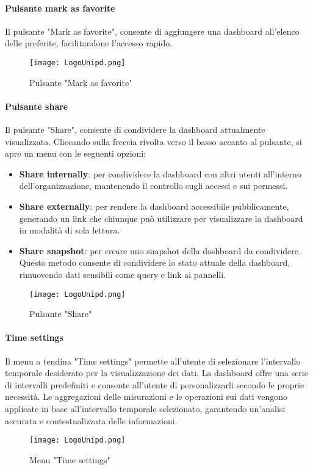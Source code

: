 \documentclass[10pt]{article}
\begin{document}
\begin{justify}
    \paragraph{Pulsante mark as favorite}
    Il pulsante "Mark as favorite", consente di aggiungere una dashboard all'elenco delle preferite, facilitandone l'accesso rapido.
    \begin{figure}[H]
    \centering
    \texttt{[image: LogoUnipd.png]}
    \caption{Pulsante "Mark as favorite"}
    \end{figure}

    \paragraph{Pulsante share}
    Il pulsante "Share", consente di condividere la dashboard attualmente visualizzata. Cliccando sulla freccia rivolta verso il basso accanto al pulsante, si apre un menu con le seguenti opzioni:
    \begin{itemize}
        \item \textbf{Share internally}: per condividere la dashboard con altri utenti all'interno dell'organizzazione, mantenendo il controllo sugli accessi e sui permessi.
        \item \textbf{Share externally}: per rendere la dashboard accessibile pubblicamente, generando un link che chiunque può utilizzare per visualizzare la dashboard in modalità di sola lettura.
        \item \textbf{Share snapshot}: per creare uno snapshot della dashboard da condividere. Questo metodo consente di condividere lo stato attuale della dashboard, rimuovendo dati sensibili come query e link ai pannelli.
    \end{itemize}
    \begin{figure}[H]
    \centering
    \texttt{[image: LogoUnipd.png]}
    \caption{Pulsante "Share"}
    \end{figure}

    \paragraph{Time settings}
    Il menu a tendina "Time settings" permette all'utente di selezionare l'intervallo temporale desiderato per la visualizzazione dei dati. La dashboard offre una serie di intervalli predefiniti e consente all'utente di personalizzarli secondo le proprie necessità. Le aggregazioni delle misurazioni e le operazioni sui dati vengono applicate in base all'intervallo temporale selezionato, garantendo un'analisi accurata e contestualizzata delle informazioni.
    \begin{figure}[H]
    \centering
    \texttt{[image: LogoUnipd.png]}
    \caption{Menu "Time settings"}
    \end{figure}


\end{justify}
\end{document}
